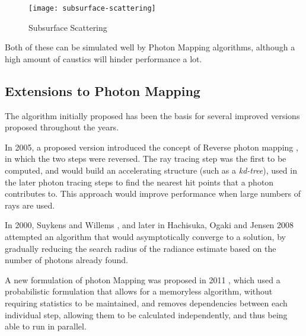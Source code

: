\documentclass[main.tex]{subfiles}
\begin{document}
\begin{figure}[!htp]
  \centering
  \texttt{[image: subsurface-scattering]}
  \caption{Subsurface Scattering \label{fig:subscat}}
\end{figure}

Both of these can be simulated well by Photon Mapping algorithms, although a high amount of caustics will hinder performance a lot.


\subsection{Extensions to Photon Mapping}

The algorithm initially proposed \cite{jensen1996global} has been the basis for several improved versions proposed throughout the years.

In 2005, a proposed version introduced the concept of Reverse photon mapping \cite{havran2005fast}, in which the two steps were reversed. The ray tracing step was the first to be computed, and would build an accelerating structure (such as a \textit{kd-tree}), used in the later photon tracing steps to find the nearest hit points that a photon contributes to. This approach would improve performance when large numbers of rays are used.

In 2000, Suykens and Willems \cite{suykens2000adaptive}, and later in Hachisuka, Ogaki and Jensen 2008 \cite{hachisuka2008progressive} attempted an algorithm that would asymptotically converge to a solution, by gradually reducing the search radius of the radiance estimate based on the number of photons already found.

A new formulation of photon Mapping was proposed in 2011 \cite{knaus2011progressive}, which used a probabilistic formulation that allows for a memoryless algorithm, without requiring statistics to be maintained, and removes dependencies between each individual step, allowing them to be calculated independently, and thus being able to run in parallel.
\end{document}
